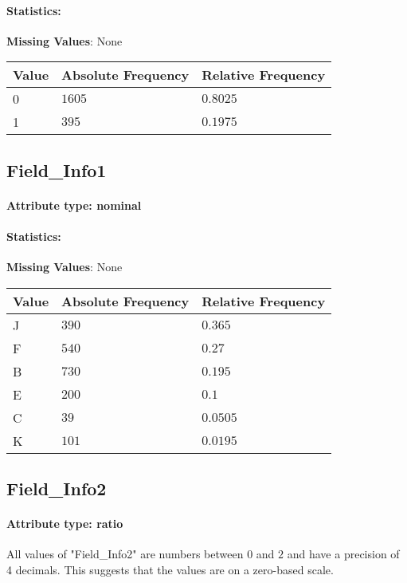 \paragraph{Statistics: }
\textbf{Missing Values}: None

\begin{table}[H]
	\renewcommand{\arraystretch}{1.25}
		\begin{tabular}{l|l|l}
			\textbf{Value} & \textbf{Absolute Frequency} & \textbf{Relative Frequency}\\\hline
			0 & $1605$ & $0.8025$\\ \hline
			1 & $395$ & $0.1975$\\
		\end{tabular}
\end{table}


\subsection{Field\_Info1}
\paragraph{Attribute type: nominal}
\paragraph{Statistics: }
\textbf{Missing Values}: None

\begin{table}[H]
	\renewcommand{\arraystretch}{1.25}
	\begin{tabular}{l|l|l}
		\textbf{Value} & \textbf{Absolute Frequency} & \textbf{Relative Frequency}\\\hline
			J&$390$ & $0.365$\\\hline
			F&$540$ & $0.27$\\\hline
			B&$730$ & $0.195$\\\hline
			E&$200$ & $0.1$\\\hline
			C&$39$ & $0.0505$\\\hline
			K&$101$ & $0.0195$\\
	\end{tabular}
\end{table}


\subsection{Field\_Info2}
\paragraph{Attribute type: ratio}
All values of "Field\_Info2" are numbers between $0$ and $2$ and have a precision of 4 decimals. This suggests that the values are on a zero-based scale.
